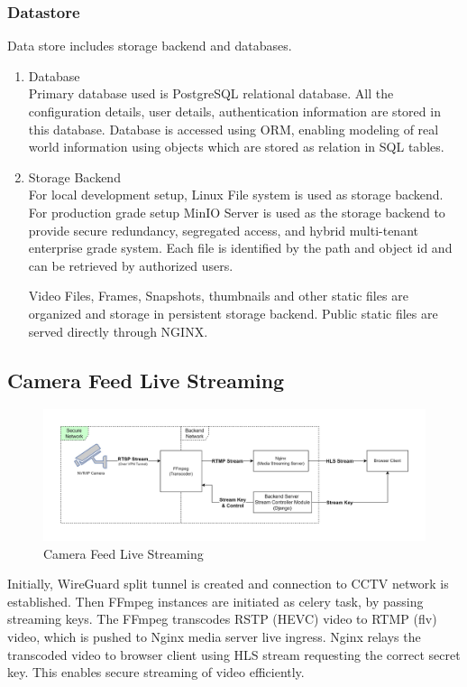 \subsubsection{Datastore}
Data store includes storage backend and databases. 
	\begin{enumerate}
		\item Database \\
		Primary database used is PostgreSQL relational database. All the configuration details, user details, authentication information are stored in this database. Database is accessed using ORM, enabling modeling of real world information using objects which are stored as relation in SQL tables.
		
		\item Storage Backend \\
		For local development setup, Linux File system is used as storage backend. For production grade setup MinIO Server is used as the storage backend to provide secure redundancy, segregated access, and hybrid multi-tenant enterprise grade system. Each file is identified by the path and object id and can be retrieved by authorized users.
		
		Video Files, Frames, Snapshots, thumbnails and other static files are organized and storage in persistent storage backend. Public static files are served directly through NGINX.
	\end{enumerate}

	


\subsection{Camera Feed Live Streaming}
\begin{figure}[ht!]
	\centering
	\includegraphics[width=0.8\linewidth]{Images/live_stream_arch}
	\caption{Camera Feed Live Streaming}
	\label{fig:livestreamarch}
\end{figure}
Initially, WireGuard split tunnel is created and connection to CCTV network is established. Then FFmpeg instances are initiated as celery task, by passing streaming keys. The FFmpeg transcodes RSTP (HEVC) video to RTMP (flv) video, which is pushed to Nginx media server live ingress. Nginx relays the transcoded video to browser client using HLS stream requesting the correct secret key. This enables secure streaming of video efficiently.

